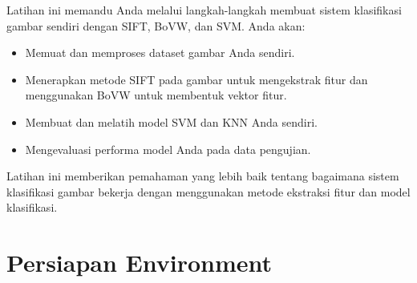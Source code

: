 \documentclass[
  letterpaper,
  DIV=11,
  numbers=noendperiod]{scrreprt}
\providecommand{\tightlist}{%
  \setlength{\itemsep}{0pt}\setlength{\parskip}{0pt}}\usepackage{longtable,booktabs,array}
\begin{document}
Latihan ini memandu Anda melalui langkah-langkah membuat sistem
klasifikasi gambar sendiri dengan SIFT, BoVW, dan SVM. Anda akan:

\begin{itemize}
\tightlist
\item
  Memuat dan memproses dataset gambar Anda sendiri.
\item
  Menerapkan metode SIFT pada gambar untuk mengekstrak fitur dan
  menggunakan BoVW untuk membentuk vektor fitur.
\item
  Membuat dan melatih model SVM dan KNN Anda sendiri.\\
\item
  Mengevaluasi performa model Anda pada data pengujian.
\end{itemize}

Latihan ini memberikan pemahaman yang lebih baik tentang bagaimana
sistem klasifikasi gambar bekerja dengan menggunakan metode ekstraksi
fitur dan model klasifikasi.

\hypertarget{persiapan-environment}{%
\section*{Persiapan Environment}\label{persiapan-environment}}

\end{document}

